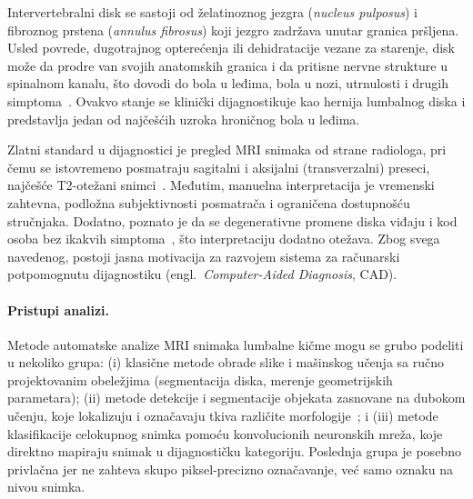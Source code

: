 \documentclass[12pt,a4paper]{article}
\begin{document}
Intervertebralni disk se sastoji od želatinoznog jezgra (\textit{nucleus pulposus}) i
fibroznog prstena (\textit{annulus fibrosus}) koji jezgro zadržava unutar granica
pršljena. Usled povrede, dugotrajnog opterećenja ili dehidratacije vezane za starenje,
disk može da prodre van svojih anatomskih granica i da pritisne nervne strukture u
spinalnom kanalu, što dovodi do bola u leđima, bola u nozi, utrnulosti i drugih
simptoma~\cite{hou2023mri}. Ovakvo stanje se klinički dijagnostikuje kao hernija
lumbalnog diska i predstavlja jedan od najčešćih uzroka hroničnog bola u leđima.

Zlatni standard u dijagnostici je pregled MRI snimaka od strane radiologa, pri čemu se
istovremeno posmatraju sagitalni i aksijalni (transverzalni) preseci, najčešće
T2-otežani snimci~\cite{hou2023mri}. Međutim, manuelna interpretacija je vremenski
zahtevna, podložna subjektivnosti posmatrača i ograničena dostupnošću stručnjaka.
Dodatno, poznato je da se degenerativne promene diska viđaju i kod osoba bez ikakvih
simptoma~\cite{jensen1994mri}, što interpretaciju dodatno otežava. Zbog svega navedenog,
postoji jasna motivacija za razvojem sistema za računarski potpomognutu dijagnostiku
(engl.\ \textit{Computer-Aided Diagnosis}, CAD).

\paragraph{Pristupi analizi.}
Metode automatske analize MRI snimaka lumbalne kičme mogu se grubo podeliti u nekoliko
grupa: (i) klasične metode obrade slike i mašinskog učenja sa ručno projektovanim
obeležjima (segmentacija diska, merenje geometrijskih parametara); (ii) metode detekcije
i segmentacije objekata zasnovane na dubokom učenju, koje lokalizuju i označavaju tkiva
različite morfologije~\cite{litjens2017survey}; i (iii) metode klasifikacije celokupnog
snimka pomoću konvolucionih neuronskih mreža, koje direktno mapiraju snimak u
dijagnostičku kategoriju. Poslednja grupa je posebno privlačna jer ne zahteva skupo
piksel-precizno označavanje, već samo oznaku na nivou snimka.
\end{document}
